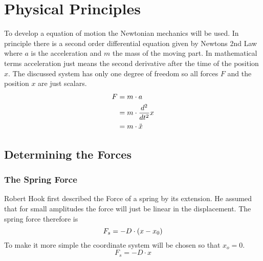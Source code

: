 \section{Physical Principles}
To develop a equation of motion the Newtonian mechanics will be used. In principle there is a second order differential equation given by Newtons 2nd Law where \(a\) is the acceleration and \(m\) the mass of the moving part. In mathematical terms acceleration just means the second derivative after the time of the position \(x\). The discussed system has only one degree of freedom so all forces \(F\) and the position \(x\) are just scalars.
\begin{align}
F &= m \cdot a\notag\\
 &= m \cdot \frac{d^2}{dt^2}x\notag\\
 &= m \cdot \ddot x
\label{2nd_law}
\end{align}
\subsection{Determining the Forces}
\subsubsection{The Spring Force}
Robert Hook first described the Force of a spring by its extension. He assumed that for small amplitudes the force will just be linear in the displacement. The spring force therefore is
\begin{equation}
F_s = -D \cdot \left( x - x_0 \right)
\notag
\end{equation}
To make it more simple the coordinate system will be chosen so that \(x_o = 0 \). 
\begin{equation}
F_s = -D \cdot  x
\label{spring}
\end{equation}
